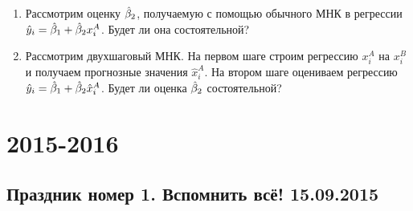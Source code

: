 \documentclass[12pt, a4paper]{article}
\begin{document}
\begin{enumerate}
\begin{enumerate}
\item Рассмотрим оценку $\hat{\beta}_2$, получаемую с помощью обычного МНК в регрессии $\hat{y}_i=\hat{\beta}_1+\hat{\beta}_2 x_i^A$. Будет ли она состоятельной?
\item Рассмотрим двухшаговый МНК. На первом шаге строим регрессию $x_i^A$ на $x_i^B$ и получаем прогнозные значения $\hat{x}_i^A$. На втором шаге  оцениваем регрессию $\hat{y}_i=\hat{\beta}_1+\hat{\beta}_2 \hat{x}_i^A$. Будет ли оценка $\hat{\beta}_2$ состоятельной?
\end{enumerate}



\end{enumerate}

\section{2015-2016}

\subsection{Праздник номер 1. Вспомнить всё! 15.09.2015}
\end{document}

